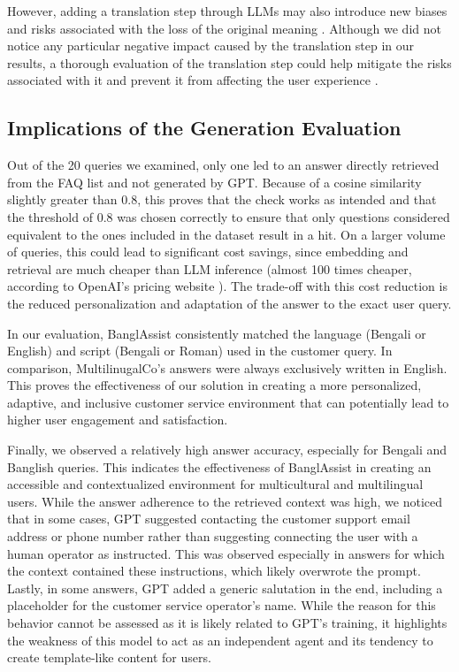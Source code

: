 \documentclass[sigconf]{acmart}
\begin{document}
However, adding a translation step through LLMs may also introduce new biases and risks associated with the loss of the original meaning \cite{seaborn2023m}. Although we did not notice any particular negative impact caused by the translation step in our results, a thorough evaluation of the translation step could help mitigate the risks associated with it and prevent it from affecting the user experience \cite{weidinger2022taxonomy,muller2024genaichi}.

\subsection{Implications of the Generation Evaluation}

Out of the 20 queries we examined, only one led to an answer directly retrieved from the FAQ list and not generated by GPT. Because of a cosine similarity slightly greater than 0.8, this proves that the check works as intended and that the threshold of 0.8 was chosen correctly to ensure that only questions considered equivalent to the ones included in the dataset result in a hit. On a larger volume of queries, this could lead to significant cost savings, since embedding and retrieval are much cheaper than LLM inference (almost 100 times cheaper, according to OpenAI's pricing website \cite{openaipricing}). The trade-off with this cost reduction is the reduced personalization and adaptation of the answer to the exact user query.

In our evaluation, BanglAssist consistently matched the language (Bengali or English) and script (Bengali or Roman) used in the customer query. In comparison, MultilinugalCo's answers were always exclusively written in English. This proves the effectiveness of our solution in creating a more personalized, adaptive, and inclusive customer service environment that can potentially lead to higher user engagement and satisfaction.

Finally, we observed a relatively high answer accuracy, especially for Bengali and Banglish queries. This indicates the effectiveness of BanglAssist in creating an accessible and contextualized environment for multicultural and multilingual users. While the answer adherence to the retrieved context was high, we noticed that in some cases, GPT suggested contacting the customer support email address or phone number rather than suggesting connecting the user with a human operator as instructed. This was observed especially in answers for which the context contained these instructions, which likely overwrote the prompt. Lastly, in some answers, GPT added a generic salutation in the end, including a placeholder for the customer service operator's name. While the reason for this behavior cannot be assessed as it is likely related to GPT's training, it highlights the weakness of this model to act as an independent agent and its tendency to create template-like content for users.
\end{document}
